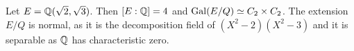 
%



%
%
\begin{example}
    Let $E=\mathbb{Q}(\sqrt{2},\sqrt{3})$. Then 
    $[E:\mathbb{Q}]=4$ and 
    $\operatorname{Gal}(E/Q)\simeq C_2\times C_2$. The extension $E/Q$ is normal, 
    as it is the decomposition field of $(X^2-2)(X^2-3)$ and 
    it is separable as $\mathbb{Q}$ has characteristic zero. 
\end{example}

